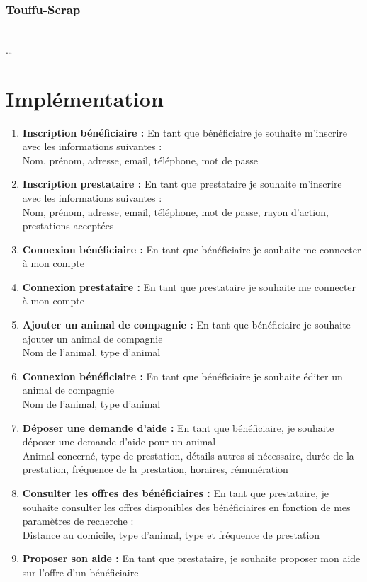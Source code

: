 \documentclass[conference]{IEEEtran}
\begin{document}
\subsubsection*{Touffu-Scrap}
\hfil\\
…\\

\section{Implémentation}

\begin{enumerate}
	\item \textbf{Inscription bénéficiaire :} En tant que bénéficiaire je souhaite m'inscrire avec les informations suivantes :
	\\Nom, prénom, adresse, email, téléphone, mot de passe
	\item \textbf{Inscription prestataire :} En tant que prestataire je souhaite m'inscrire avec les informations suivantes :
	\\Nom, prénom, adresse, email, téléphone, mot de passe, rayon d'action, prestations acceptées
	\item \textbf{Connexion bénéficiaire :} En tant que bénéficiaire je souhaite me connecter à mon compte
	\item \textbf{Connexion prestataire :} En tant que prestataire je souhaite me connecter à mon compte
	\item \textbf{Ajouter un animal de compagnie :} En tant que bénéficiaire je souhaite ajouter un animal de compagnie
	\\Nom de l'animal, type d'animal
	\item \textbf{Connexion bénéficiaire :} En tant que bénéficiaire je souhaite éditer un animal de compagnie
	\\Nom de l'animal, type d'animal
	\item \textbf{Déposer une demande d'aide :} En tant que bénéficiaire, je souhaite déposer une demande d'aide pour un animal
	\\Animal concerné, type de prestation, détails autres si nécessaire, durée de la prestation, fréquence de la prestation, horaires, rémunération
	\item \textbf{Consulter les offres des bénéficiaires :} En tant que prestataire, je souhaite consulter les offres disponibles des bénéficiaires en fonction de mes paramètres de recherche :
	\\Distance au domicile, type d'animal, type et fréquence de prestation
	\item \textbf{Proposer son aide :} En tant que prestataire, je souhaite proposer mon aide sur l'offre d'un bénéficiaire

\end{enumerate}
\end{document}
